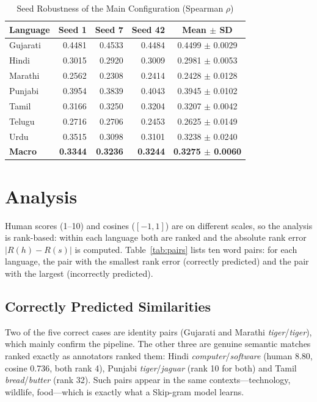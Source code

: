 \documentclass[conference,10pt]{IEEEtran}
\begin{document}
\begin{table}[!t]
\caption{Seed Robustness of the Main Configuration (Spearman $\rho$)}
\label{tab:seeds}
\centering
\renewcommand{\arraystretch}{1.2}
\footnotesize
\setlength{\tabcolsep}{3.5pt}
\begin{tabular}{|l|r|r|r|c|}
\hline
\rowcolor{srcblue!15}
\textbf{Language} & \textbf{Seed 1} & \textbf{Seed 7} & \textbf{Seed 42} & \textbf{Mean $\pm$ SD} \\
\hline
Gujarati & 0.4481 & 0.4533 & 0.4484 & 0.4499 $\pm$ 0.0029 \\
\hline
Hindi & 0.3015 & 0.2920 & 0.3009 & 0.2981 $\pm$ 0.0053 \\
\hline
Marathi & 0.2562 & 0.2308 & 0.2414 & 0.2428 $\pm$ 0.0128 \\
\hline
Punjabi & 0.3954 & 0.3839 & 0.4043 & 0.3945 $\pm$ 0.0102 \\
\hline
Tamil & 0.3166 & 0.3250 & 0.3204 & 0.3207 $\pm$ 0.0042 \\
\hline
Telugu & 0.2716 & 0.2706 & 0.2453 & 0.2625 $\pm$ 0.0149 \\
\hline
Urdu & 0.3515 & 0.3098 & 0.3101 & 0.3238 $\pm$ 0.0240 \\
\hline
\textbf{Macro} & \textbf{0.3344} & \textbf{0.3236} & \textbf{0.3244} & \textbf{0.3275 $\pm$ 0.0060} \\
\hline
\end{tabular}
\end{table}

\section{Analysis}\label{sec:analysis}
Human scores (1--10) and cosines ($[-1,1]$) are on different scales, so the analysis is rank-based: within each language both are ranked and the absolute rank error $|R(h) - R(s)|$ is computed. Table~\ref{tab:pairs} lists ten word pairs: for each language, the pair with the smallest rank error (correctly predicted) and the pair with the largest (incorrectly predicted).



\subsection{Correctly Predicted Similarities}
Two of the five correct cases are identity pairs (Gujarati and Marathi \textit{tiger}/\textit{tiger}), which mainly confirm the pipeline. The other three are genuine semantic matches ranked exactly as annotators ranked them: Hindi \textit{computer}/\textit{software} (human 8.80, cosine 0.736, both rank 4), Punjabi \textit{tiger}/\textit{jaguar} (rank 10 for both) and Tamil \textit{bread}/\textit{butter} (rank 32). Such pairs appear in the same contexts---technology, wildlife, food---which is exactly what a Skip-gram model learns.
\end{document}
